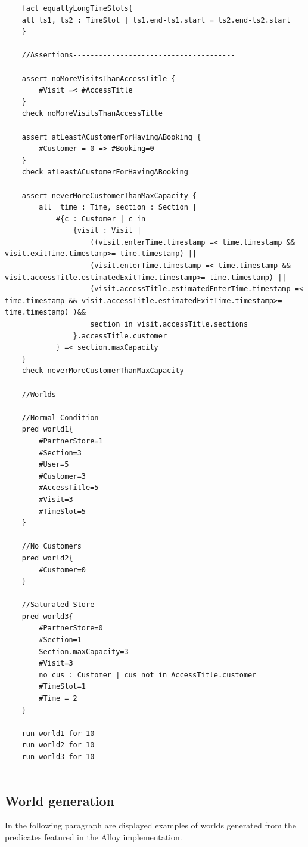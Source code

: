 \begin{lstlisting}
    fact equallyLongTimeSlots{
    all ts1, ts2 : TimeSlot | ts1.end-ts1.start = ts2.end-ts2.start
    }

    //Assertions--------------------------------------

    assert noMoreVisitsThanAccessTitle {
        #Visit =< #AccessTitle
    }
    check noMoreVisitsThanAccessTitle

    assert atLeastACustomerForHavingABooking {
        #Customer = 0 => #Booking=0
    }
    check atLeastACustomerForHavingABooking

    assert neverMoreCustomerThanMaxCapacity {
        all  time : Time, section : Section |
            #{c : Customer | c in
                {visit : Visit |
                    ((visit.enterTime.timestamp =< time.timestamp && visit.exitTime.timestamp>= time.timestamp) ||
                    (visit.enterTime.timestamp =< time.timestamp && visit.accessTitle.estimatedExitTime.timestamp>= time.timestamp) ||
                    (visit.accessTitle.estimatedEnterTime.timestamp =< time.timestamp && visit.accessTitle.estimatedExitTime.timestamp>= time.timestamp) )&&
                    section in visit.accessTitle.sections
                }.accessTitle.customer
            } =< section.maxCapacity
    }
    check neverMoreCustomerThanMaxCapacity

    //Worlds--------------------------------------------

    //Normal Condition
    pred world1{
        #PartnerStore=1
        #Section=3
        #User=5
        #Customer=3
        #AccessTitle=5
        #Visit=3
        #TimeSlot=5
    }

    //No Customers
    pred world2{
        #Customer=0
    }

    //Saturated Store
    pred world3{
        #PartnerStore=0
        #Section=1
        Section.maxCapacity=3
        #Visit=3
        no cus : Customer | cus not in AccessTitle.customer
        #TimeSlot=1
        #Time = 2
    }

    run world1 for 10
    run world2 for 10
    run world3 for 10


\end{lstlisting}

\subsection{World generation}

In the following paragraph are displayed examples of worlds generated
from the predicates featured in the Alloy implementation.

